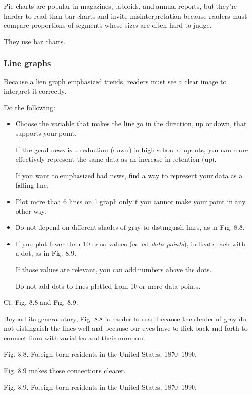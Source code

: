 \documentclass[oneside]{book}
\numberwithin{equation}{section}
\begin{document}
Pie charts are popular in magazines, tabloids, and annual reports, but they're harder to read than bar charts and invite misinterpretation because readers must compare proportions of segments whose sizes are often hard to judge.


They use bar charts.

\subsubsection{Line graphs}
Because a lien graph emphasized trends, readers must see a clear image to interpret it correctly.

Do the following:
\begin{itemize}
    \item Choose the variable that makes the line go in the direction, up or down, that supports your point.
    
    If the good news is a reduction (down) in high school dropouts, you can more effectively represent the same data as an increase in retention (up).
    
    If you want to emphasized bad news, find a way to represent your data as a falling line.
    \item Plot more than 6 lines on 1 graph only if you cannot make your point in any other way.
    \item Do not depend on different shades of gray to distinguish lines, as in Fig. 8.8.
    \item If you plot fewer than 10 or so values (called \textit{data points}), indicate each with a dot, as in Fig. 8.9.
    
    If those values are relevant, you can add numbers above the dots.
    
    Do not add dots to lines plotted from 10 or more data points.
\end{itemize}
Cf. Fig. 8.8 and Fig. 8.9.

Beyond its general story, Fig. 8.8 is harder to read because the shades of gray do not distinguish the lines well and because our eyes have to flick back and forth to connect lines with variables and their numbers.

\textsf{Fig. 8.8. Foreign-born residents in the United States, 1870--1990.}

Fig. 8.9 makes those connections clearer.

\textsf{Fig. 8.9. Foreign-born residents in the United States, 1870--1990.}
\end{document}
